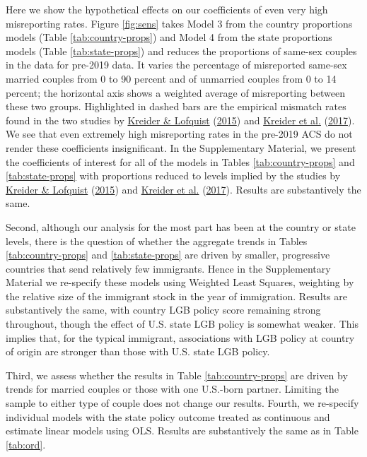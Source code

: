 \documentclass[
  11pt,
]{article}
\begin{document}
Here we show the hypothetical effects on our coefficients of even very high misreporting rates. Figure \ref{fig:sens} takes Model 3 from the country proportions models (Table \ref{tab:country-props}) and Model 4 from the state proportions models (Table \ref{tab:state-props}) and reduces the proportions of same-sex couples in the data for pre-2019 data. It varies the percentage of misreported same-sex married couples from 0 to 90 percent and of unmarried couples from 0 to 14 percent; the horizontal axis shows a weighted average of misreporting between these two groups. Highlighted in dashed bars are the empirical mismatch rates found in the two studies by \protect\hyperlink{ref-kreider_2015}{Kreider \& Lofquist} (\protect\hyperlink{ref-kreider_2015}{2015}) and \protect\hyperlink{ref-kreider_2017}{Kreider et al.} (\protect\hyperlink{ref-kreider_2017}{2017}). We see that even extremely high misreporting rates in the pre-2019 ACS do not render these coefficients insignificant. In the Supplementary Material, we present the coefficients of interest for all of the models in Tables \ref{tab:country-props} and \ref{tab:state-props} with proportions reduced to levels implied by the studies by \protect\hyperlink{ref-kreider_2015}{Kreider \& Lofquist} (\protect\hyperlink{ref-kreider_2015}{2015}) and \protect\hyperlink{ref-kreider_2017}{Kreider et al.} (\protect\hyperlink{ref-kreider_2017}{2017}). Results are substantively the same.

Second, although our analysis for the most part has been at the country or state levels, there is the question of whether the aggregate trends in Tables \ref{tab:country-props} and \ref{tab:state-props} are driven by smaller, progressive countries that send relatively few immigrants. Hence in the Supplementary Material we re-specify these models using Weighted Least Squares, weighting by the relative size of the immigrant stock in the year of immigration. Results are substantively the same, with country LGB policy score remaining strong throughout, though the effect of U.S. state LGB policy is somewhat weaker. This implies that, for the typical immigrant, associations with LGB policy at country of origin are stronger than those with U.S. state LGB policy.

Third, we assess whether the results in Table \ref{tab:country-props} are driven by trends for married couples or those with one U.S.-born partner. Limiting the sample to either type of couple does not change our results. Fourth, we re-specify individual models with the state policy outcome treated as continuous and estimate linear models using OLS. Results are substantively the same as in Table \ref{tab:ord}.
\end{document}
